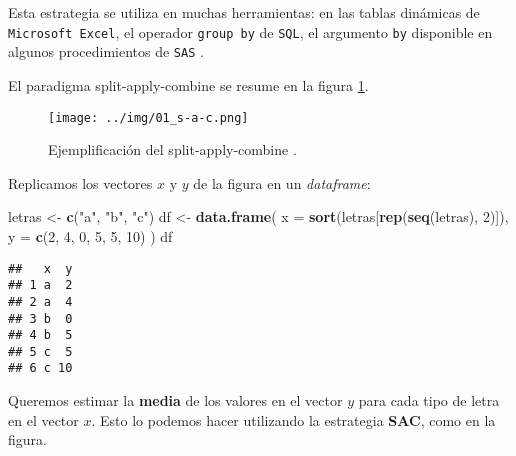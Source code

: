 \documentclass[]{article}
\newenvironment{Shaded}{\begin{snugshade}}{\end{snugshade}}
\newcommand{\KeywordTok}[1]{\textcolor[rgb]{0.13,0.29,0.53}{\textbf{{#1}}}}
\newcommand{\DataTypeTok}[1]{\textcolor[rgb]{0.13,0.29,0.53}{{#1}}}
\newcommand{\DecValTok}[1]{\textcolor[rgb]{0.00,0.00,0.81}{{#1}}}
\newcommand{\StringTok}[1]{\textcolor[rgb]{0.31,0.60,0.02}{{#1}}}
\newcommand{\CommentTok}[1]{\textcolor[rgb]{0.56,0.35,0.01}{\textit{{#1}}}}
\newcommand{\NormalTok}[1]{{#1}}
\begin{document}
Esta estrategia se utiliza en muchas herramientas: en las tablas
dinámicas de \texttt{Microsoft Excel}, el operador \texttt{group by} de
\texttt{SQL}, el argumento \texttt{by} disponible en algunos
procedimientos de \texttt{SAS} \parencite{wickham2011split}.

El paradigma split-apply-combine se resume en la figura \ref{fig:sac}.

\begin{figure}[h]
    \centering
    \texttt{[image: ../img/01\_s-a-c.png]}
    \caption{Ejemplificación del split-apply-combine \textcite[Split-Apply-Combine]{vaidyanathan2014r}.}
    \label{fig:sac}
\end{figure}

Replicamos los vectores $x$ y $y$ de la figura en un \emph{dataframe}:

\begin{Shaded}
\begin{Highlighting}[]
\NormalTok{letras <-}\StringTok{ }\KeywordTok{c}\NormalTok{(}\StringTok{"a"}\NormalTok{, }\StringTok{"b"}\NormalTok{, }\StringTok{"c"}\NormalTok{)}
\NormalTok{df <-}\StringTok{ }\KeywordTok{data.frame}\NormalTok{(}
  \DataTypeTok{x =} \KeywordTok{sort}\NormalTok{(letras[}\KeywordTok{rep}\NormalTok{(}\KeywordTok{seq}\NormalTok{(letras), }\DecValTok{2}\NormalTok{)]),}
  \DataTypeTok{y =} \KeywordTok{c}\NormalTok{(}\DecValTok{2}\NormalTok{, }\DecValTok{4}\NormalTok{, }\DecValTok{0}\NormalTok{, }\DecValTok{5}\NormalTok{, }\DecValTok{5}\NormalTok{, }\DecValTok{10}\NormalTok{)}
\NormalTok{)}
\NormalTok{df}
\end{Highlighting}
\end{Shaded}

\begin{verbatim}
##   x  y
## 1 a  2
## 2 a  4
## 3 b  0
## 4 b  5
## 5 c  5
## 6 c 10
\end{verbatim}

Queremos estimar la \textbf{media} de los valores en el vector $y$ para
cada tipo de letra en el vector $x$. Esto lo podemos hacer utilizando la
estrategia \textbf{SAC}, como en la figura.

\begin{Shaded}
\end{Shaded}
\end{document}

